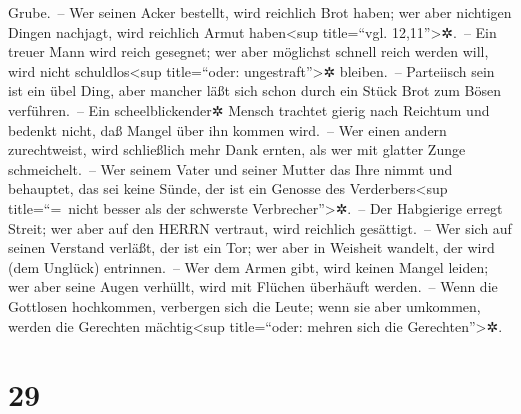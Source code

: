 Grube.~-- Wer seinen Acker bestellt, wird reichlich Brot
haben; wer aber nichtigen Dingen nachjagt, wird reichlich Armut
haben\textless sup title=``vgl. 12,11''\textgreater✲.~--
Ein treuer Mann wird reich gesegnet; wer aber möglichst
schnell reich werden will, wird nicht schuldlos\textless sup
title=``oder: ungestraft''\textgreater✲ bleiben.~--
Parteiisch sein ist ein übel Ding, aber mancher läßt sich
schon durch ein Stück Brot zum Bösen verführen.~-- Ein
scheelblickender✲ Mensch trachtet gierig nach Reichtum und bedenkt
nicht, daß Mangel über ihn kommen wird.~-- Wer einen
andern zurechtweist, wird schließlich mehr Dank ernten, als wer mit
glatter Zunge schmeichelt.~-- Wer seinem Vater und seiner
Mutter das Ihre nimmt und behauptet, das sei keine Sünde, der ist ein
Genosse des Verderbers\textless sup title=``=~nicht besser als der
schwerste Verbrecher''\textgreater✲.~-- Der Habgierige
erregt Streit; wer aber auf den HERRN vertraut, wird reichlich
gesättigt.~-- Wer sich auf seinen Verstand verläßt, der
ist ein Tor; wer aber in Weisheit wandelt, der wird (dem Unglück)
entrinnen.~-- Wer dem Armen gibt, wird keinen Mangel
leiden; wer aber seine Augen verhüllt, wird mit Flüchen überhäuft
werden.~-- Wenn die Gottlosen hochkommen, verbergen sich
die Leute; wenn sie aber umkommen, werden die Gerechten
mächtig\textless sup title=``oder: mehren sich die
Gerechten''\textgreater✲.

\hypertarget{section-28}{%
\section{29}\label{section-28}}

